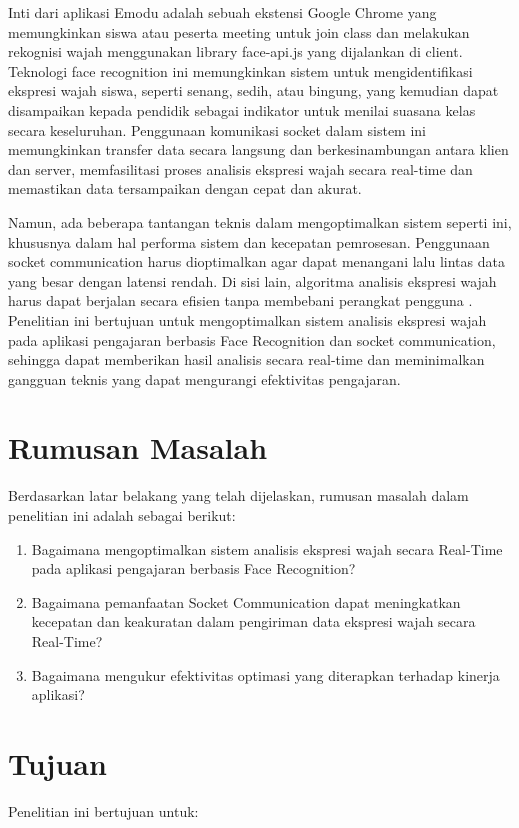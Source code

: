 Inti dari aplikasi Emodu adalah sebuah ekstensi Google Chrome yang memungkinkan siswa atau peserta meeting untuk join class dan melakukan rekognisi wajah menggunakan library face-api.js yang dijalankan di client. Teknologi face recognition ini memungkinkan sistem untuk mengidentifikasi ekspresi wajah siswa, seperti senang, sedih, atau bingung, yang kemudian dapat disampaikan kepada pendidik sebagai indikator untuk menilai suasana kelas secara keseluruhan. Penggunaan komunikasi socket dalam sistem ini memungkinkan transfer data secara langsung dan berkesinambungan antara klien dan server, memfasilitasi proses analisis ekspresi wajah secara real-time dan memastikan data tersampaikan dengan cepat dan akurat.

Namun, ada beberapa tantangan teknis dalam mengoptimalkan sistem seperti ini, khususnya dalam hal performa sistem dan kecepatan pemrosesan. Penggunaan socket communication harus dioptimalkan agar dapat menangani lalu lintas data yang besar dengan latensi rendah. Di sisi lain, algoritma analisis ekspresi wajah harus dapat berjalan secara efisien tanpa membebani perangkat pengguna \parencite{phankokkruadRealtimeFaceRecognition2016}. Penelitian ini bertujuan untuk mengoptimalkan sistem analisis ekspresi wajah pada aplikasi pengajaran berbasis Face Recognition dan socket communication, sehingga dapat memberikan hasil analisis secara real-time dan meminimalkan gangguan teknis yang dapat mengurangi efektivitas pengajaran.

\section{Rumusan Masalah}
{Berdasarkan latar belakang yang telah dijelaskan, rumusan masalah dalam penelitian ini adalah sebagai berikut:}

\begin{enumerate}
  \item
    {Bagaimana mengoptimalkan sistem analisis ekspresi wajah secara Real-Time pada aplikasi pengajaran berbasis Face Recognition?}
  \item
    {Bagaimana pemanfaatan Socket Communication dapat meningkatkan kecepatan dan keakuratan dalam pengiriman data ekspresi wajah secara Real-Time?}
  \item
    {Bagaimana mengukur efektivitas optimasi yang diterapkan terhadap kinerja aplikasi?}
\end{enumerate}

\section{Tujuan}
{Penelitian ini bertujuan untuk:}

